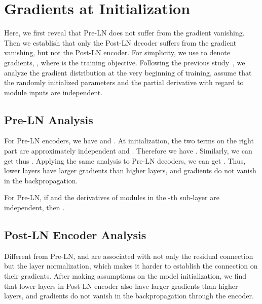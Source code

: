\appendixpage

\setcounter{theorem}{0}    


\section{Gradients at Initialization}
\label{appendix:ini_grad}

Here, we first reveal that Pre-LN does not suffer from the gradient vanishing. 
Then we establish that only the Post-LN decoder suffers from the gradient vanishing, but not the Post-LN encoder. 
For simplicity, we use  to denote gradients, \ie,  where  is the training objective. 
Following the previous study~\cite{Bengio1994LearningLD,Glorot2010UnderstandingTD,He2015DelvingDI,saxe2013exact}, we analyze the gradient distribution at the very beginning of training, assume that the randomly initialized parameters and the partial derivative with regard to module inputs are independent.


\subsection{Pre-LN Analysis}
\label{subsec:preln-analysis}
For Pre-LN encoders, we have 
 and
. 
At initialization, the two terms on the right part are approximately independent and . Therefore we have .
Similarly, we can get  thus . 
Applying the same analysis to Pre-LN decoders, we can get .
Thus, lower layers have larger gradients than higher layers, and gradients do not vanish in the backpropagation. 
\begin{remark}
For Pre-LN, if  and the derivatives of modules in the -th sub-layer are independent, then .
\label{remark: pre-ln-gradient}
\end{remark}


\subsection{Post-LN Encoder Analysis}
\label{subsec:postln-encoder-analysis}
Different from Pre-LN,  and  are associated with not only the residual connection but the layer normalization, which makes it harder to establish the connection on their gradients.
After making assumptions on the model initialization, we find that lower layers in Post-LN encoder also have larger gradients than higher layers, and gradients do not vanish in the backpropagation through the encoder.   

